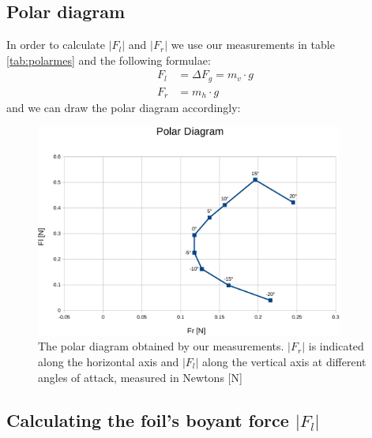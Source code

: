 \documentclass{scrreprt}
\begin{document}
\subsection{Polar diagram}
In order to calculate $\lvert F_l\rvert$ and $\lvert F_r\rvert$ we use our measurements in table \ref{tab:polarmes} and the following formulae:
\begin{align}
F_l &= \Delta F_g = m_v \cdot g\\
F_r &= m_h \cdot g
\end{align}
and we can draw the polar diagram accordingly:

\begin{figure}[H]
	\centering
  \includegraphics[width=0.9\textwidth]{diag/polar_diag.pdf}
	\caption{The polar diagram obtained by our measurements. $\lvert F_r\rvert$ is indicated along the horizontal axis and $\lvert F_l\rvert$ along the vertical axis at different angles of attack, measured in Newtons [N]}
	\label{fig:poldiag}
\end{figure}



\subsection{Calculating the foil's boyant force $\lvert F_l\rvert$}
\end{document}
